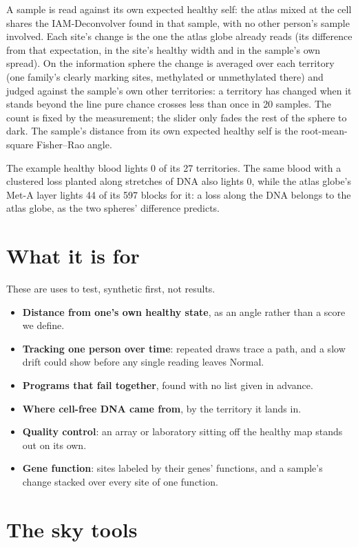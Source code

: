 A sample is read against its own expected healthy self: the atlas mixed at the cell shares the IAM-Deconvolver found in that sample, with
no other person's sample involved. Each site's change is the one the atlas globe already reads (its difference from that expectation,
in the site's healthy width and in the sample's own spread). On the information sphere the change is averaged over each territory (one
family's clearly marking sites, methylated or unmethylated there) and judged against the sample's own other territories: a territory has
changed when it stands beyond the line pure chance crosses less than once in 20 samples. The count is fixed by the measurement; the
slider only fades the rest of the sphere to dark. The sample's distance from its own expected healthy self is the root-mean-square
Fisher--Rao angle.

The example healthy blood lights 0 of its 27 territories. The same blood with a clustered loss planted along stretches of DNA also
lights 0, while the atlas globe's Met-A layer lights 44 of its 597 blocks for it: a loss along the DNA belongs to the atlas globe,
as the two spheres' difference predicts.

\section{What it is for}

These are uses to test, synthetic first, not results.
\begin{itemize}
\item \textbf{Distance from one's own healthy state}, as an angle rather than a score we define.
\item \textbf{Tracking one person over time}: repeated draws trace a path, and a slow drift could show before any single reading leaves
Normal.
\item \textbf{Programs that fail together}, found with no list given in advance.
\item \textbf{Where cell-free DNA came from}, by the territory it lands in.
\item \textbf{Quality control}: an array or laboratory sitting off the healthy map stands out on its own.
\item \textbf{Gene function}: sites labeled by their genes' functions, and a sample's change stacked over every site of one function.
\end{itemize}

\section{The sky tools}

